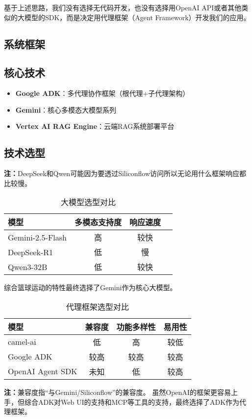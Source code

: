 \documentclass{article}
\theoremstyle{plain}
\theoremstyle{definition}
\theoremstyle{remark}
\begin{document}
基于上述思路，我们没有选择无代码开发，也没有选择用OpenAI API或者其他类似的大模型的SDK，而是决定用代理框架（Agent Framework）开发我们的应用。

\subsection{系统框架}

\subsection{核心技术}
\begin{itemize}
    \item \textbf{Google ADK}：多代理协作框架（根代理+子代理架构）
    \item \textbf{Gemini}：核心多模态大模型系列
    \item \textbf{Vertex AI RAG Engine}：云端RAG系统部署平台
\end{itemize}


\subsection{技术选型}
\textbf{注：}DeepSeek和Qwen可能因为要透过Siliconflow访问所以无论用什么框架响应都比较慢。
\begin{table}[h]
\caption{大模型选型对比}
\label{model-selection}
\centering
\begin{tabular}{lccc}
\toprule
模型 & 多模态支持度 & 响应速度\\
\midrule
Gemini-2.5-Flash & 高 & 较快 \\
DeepSeek-R1 & 低 & 慢 \\
Qwen3-32B & 低 & 较快 \\
\bottomrule
\end{tabular}
\end{table}
综合篮球运动的特性最终选择了Gemini作为核心大模型。\cite{gemini2023}

\begin{table}[h]
\caption{代理框架选型对比}
\label{model-selection}
\centering
\begin{tabular}{lccc}
\toprule
模型 & 兼容度 & 功能多样性 & 易用性 \\
\midrule
camel-ai & 低 & 高 & 较低 \\
Google ADK & 较高 & 较高 & 较高 \\
OpenAI Agent SDK & 未知 & 低 & 较高 \\
\bottomrule
\end{tabular}
\end{table}
\textbf{注：}兼容度指“与Gemini/Siliconflow”的兼容度。
虽然OpenAI的框架更容易上手\cite{key1}，但综合ADK对Web UI的支持和MCP等工具的支持，最终选择了ADK作为代理框架。
\end{document}
